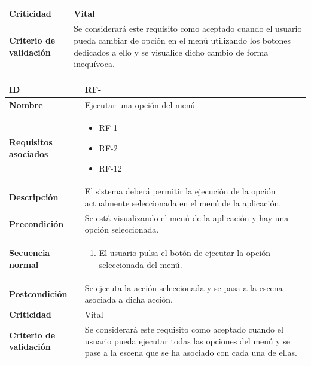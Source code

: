 \begin{center}
\begin{tabular}{ | p{4.7cm} | p{10cm} | }
		\hline 
		\textbf{Criticidad} &
		Vital\\
		
		\hline 
		\textbf{Criterio de validación} & 
		Se considerará este requisito como aceptado cuando el usuario pueda cambiar de opción en el menú utilizando los botones dedicados a ello y se visualice dicho cambio de forma inequívoca.\\
		
		\hline
	\end{tabular}
\end{center}


\begin{center}
	\begin{tabular}{ | p{4.7cm} | p{10cm} | } 
		\hline
		
		\textbf{ID} & RF-\arabic{contador_requisitos_funcionales}
		{contador_requisitos_funcionales} \\
		
		\hline 
		\textbf{Nombre} &
		Ejecutar una opción del menú\\ 
		
		\hline
		\textbf{Requisitos asociados} & 
		\begin{itemize}
			\item RF-1
			\item RF-2
			\item RF-12
		\end{itemize}\\
		
		\hline
		\textbf{Descripción} & 
		El sistema deberá permitir la ejecución de la opción actualmente seleccionada en el menú de la aplicación.\\
		
		\hline
		\textbf{Precondición} & 
		Se está visualizando el menú de la aplicación y hay una opción seleccionada.\\
		
		\hline
		\textbf{Secuencia normal} &
		\begin{enumerate}
			\item El usuario pulsa el botón de ejecutar la opción seleccionada del menú.
		\end{enumerate}
		\\
		
		\hline
		\textbf{Postcondición} & 
		Se ejecuta la acción seleccionada y se pasa a la escena asociada a dicha acción.\\
		
		\hline 
		\textbf{Criticidad} &
		Vital\\
		
		\hline 
		\textbf{Criterio de validación} & 
		Se considerará este requisito como aceptado cuando el usuario pueda ejecutar todas las opciones del menú y se pase a la escena que se ha asociado con cada una de ellas.\\
		
		\hline
	\end{tabular}
\end{center}

